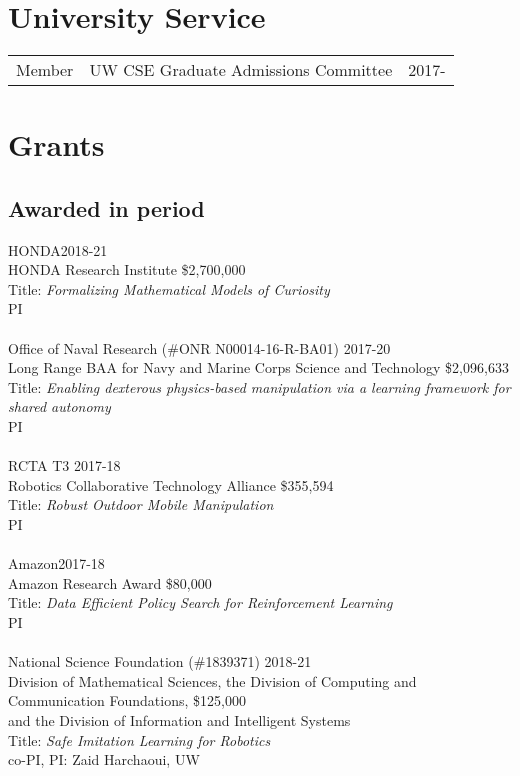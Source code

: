 \documentclass[10pt]{article}
\begin{document}
\section{University Service}
\begin{tabularx}{\linewidth}{rXr}
Member & UW CSE Graduate Admissions Committee & 2017- \\
\end{tabularx}


\newpage
\section{Grants}

\subsection{Awarded in period}
\noindent
HONDA\hfill 2018-21\\
HONDA Research Institute \hfill \$2,700,000\\
Title: \textit{Formalizing Mathematical Models of Curiosity}\\
PI\\
\\
Office of Naval Research (\#ONR N00014-16-R-BA01) \hfill 2017-20\\
Long Range BAA for Navy and Marine Corps Science and Technology \hfill \$2,096,633 \\
Title: \textit{Enabling dexterous physics-based manipulation via a learning framework for shared autonomy}\\
PI\\
\\
RCTA T3 \hfill 2017-18\\
Robotics Collaborative Technology Alliance \hfill \$355,594\\
Title: \textit{Robust Outdoor Mobile Manipulation}\\
PI\\
\\
Amazon\hfill 2017-18\\
Amazon Research Award \hfill \$80,000\\
Title: \textit{Data Efficient Policy Search for Reinforcement Learning}\\
PI\\
\\
National Science Foundation (\#1839371) \hfill 2018-21\\
Division of Mathematical Sciences, the Division of Computing and Communication Foundations, \hfill \$125,000
\\and the Division of Information and Intelligent Systems\\
Title: \textit{Safe Imitation Learning for Robotics}\\
co-PI, PI: Zaid Harchaoui, UW\\
\end{document}
